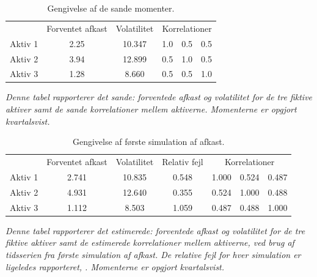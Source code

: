 \documentclass[
  a4paper,
  oneside]{memoir}
\begin{document}
\begin{table}[H]

\caption{\label{tab:true}Gengivelse af de sande momenter.}
\centering
\begin{threeparttable}
\begin{tabular}[t]{lccccc}
\toprule
\multicolumn{1}{c}{ } & \multicolumn{1}{c}{Forventet afkast} & \multicolumn{1}{c}{Volatilitet} & \multicolumn{3}{c}{Korrelationer} \\
\cmidrule(l{3pt}r{3pt}){2-2} \cmidrule(l{3pt}r{3pt}){3-3} \cmidrule(l{3pt}r{3pt}){4-6}
\rowcolor{gray!6}  Aktiv 1 & 2.25 & 10.347 & 1.0 & 0.5 & 0.5\\
Aktiv 2 & 3.94 & 12.899 & 0.5 & 1.0 & 0.5\\
\rowcolor{gray!6}  Aktiv 3 & 1.28 & 8.660 & 0.5 & 0.5 & 1.0\\
\bottomrule
\end{tabular}
\begin{tablenotes}
\item \textit{Denne tabel rapporterer det sande: forventede afkast og volatilitet for de tre fiktive aktiver samt de sande korrelationer mellem aktiverne. Momenterne er opgjort kvartalsvist.}
\end{tablenotes}
\end{threeparttable}
\end{table}



\begin{table}[H]

\caption{\label{tab:sim1}Gengivelse af første simulation af afkast.}
\centering
\begin{threeparttable}
\begin{tabular}[t]{lcccccc}
\toprule
\multicolumn{1}{c}{ } & \multicolumn{1}{c}{Forventet afkast} & \multicolumn{1}{c}{Volatilitet} & \multicolumn{1}{c}{Relativ fejl} & \multicolumn{3}{c}{Korrelationer} \\
\cmidrule(l{3pt}r{3pt}){2-2} \cmidrule(l{3pt}r{3pt}){3-3} \cmidrule(l{3pt}r{3pt}){4-4} \cmidrule(l{3pt}r{3pt}){5-7}
\rowcolor{gray!6}  Aktiv 1 & 2.741 & 10.835 & 0.548 & 1.000 & 0.524 & 0.487\\
Aktiv 2 & 4.931 & 12.640 & 0.355 & 0.524 & 1.000 & 0.488\\
\rowcolor{gray!6}  Aktiv 3 & 1.112 & 8.503 & 1.059 & 0.487 & 0.488 & 1.000\\
\bottomrule
\end{tabular}
\begin{tablenotes}
\item \textit{Denne tabel rapporterer det estimerede: forventede afkast og volatilitet for de tre fiktive aktiver samt de estimerede korrelationer mellem aktiverne, ved brug af tidsserien fra første simulation af afkast. De relative fejl for hver simulation er ligeledes rapporteret, \citep{Asmussen2007}. Momenterne er opgjort kvartalsvist.}
\end{tablenotes}
\end{threeparttable}
\end{table}
\end{document}
